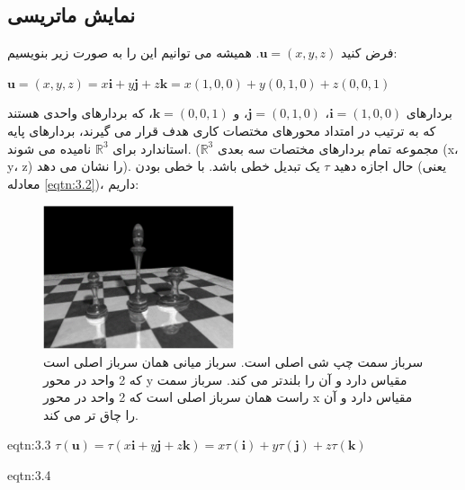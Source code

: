 \subsection{\textbf{نمایش ماتریسی}}
{
    \Large
    \begin{spacing}{1.5}
        فرض کنید $\textbf{u}=(x,y,z)$.
        همیشه می توانیم این را به صورت زیر بنویسیم:

        \begin{center}
            $\textbf{u}=(x,y,z)=x\textbf{i}+y\textbf{j}+z\textbf{k}=x(1,0,0)+y(0,1,0)+z(0,0,1)$
        \end{center}

        بردارهای $\textbf{i}=(1,0,0)$، $\textbf{j}=(0,1,0)$، و $\textbf{k}=(0,0,1)$، که بردارهای واحدی هستند
        که به ترتیب در امتداد محورهای مختصات کاری هدف قرار می گیرند، بردارهای پایه استاندارد برای $\mathbb{R}^3$ نامیده می شوند.
        ($\mathbb{R}^3$ مجموعه تمام بردارهای مختصات سه بعدی (x، y، z) را نشان می دهد).
        حال اجازه دهید $\tau$ یک تبدیل خطی باشد.
        با خطی بودن (یعنی معادله \ref{eqtn:3.2})، داریم:

        \begin{figure}[H]
            \centering
            \setlength{\belowcaptionskip}{-10pt}
            \includegraphics[width=0.5\textwidth]{Images/4/3/4.Session.1.3.1}
            \caption {سرباز سمت چپ شی اصلی است.
            سرباز میانی همان سرباز اصلی است که 2 واحد در محور y مقیاس دارد و آن را بلندتر می کند.
            سرباز سمت راست همان سرباز اصلی است که 2 واحد در محور x مقیاس دارد و آن را چاق تر می کند.}
            \label{fig:4.Session.1.3.1}
        \end{figure}

        \begin{eqtn}{eqtn:3.3}
            \centering
            $\tau(\textbf{u})=\tau(x\textbf{i}+y\textbf{j}+z\textbf{k})=x\tau(\textbf{i})+y\tau(\textbf{j})+z\tau(\textbf{k})$
        \end{eqtn}

        \begin{eqtn}{eqtn:3.4}
            \centering


\end{eqtn}
\end{spacing}}
